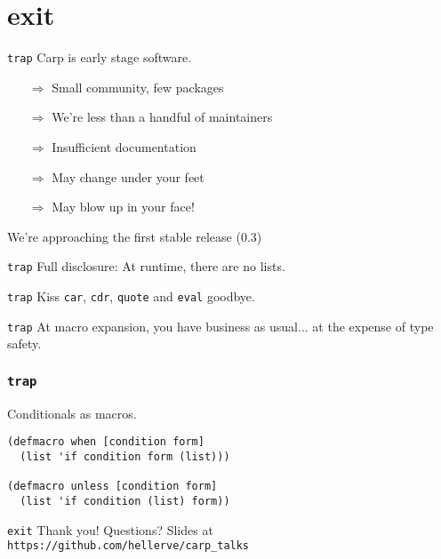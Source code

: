 \documentclass{beamer}
\begin{document}
  \section{exit}
  \begin{frame}{\texttt{trap}}
    Carp is early stage software.
    \begin{itemize}
      \item[$\Rightarrow$] Small community, few packages
      \item[$\Rightarrow$] We’re less than a handful of maintainers
      \item[$\Rightarrow$] Insufficient documentation
      \item[$\Rightarrow$] May change under your feet
      \item[$\Rightarrow$] May blow up in your face!
    \end{itemize}
    We’re approaching the first stable release (0.3)
  \end{frame}
  \begin{frame}{\texttt{trap}}
    Full disclosure: At runtime, there are no lists.
  \end{frame}
  \begin{frame}{\texttt{trap}}
    Kiss \texttt{car}, \texttt{cdr}, \texttt{quote} and \texttt{eval} goodbye.
  \end{frame}
  \begin{frame}{\texttt{trap}}
    At macro expansion, you have business as usual... at the expense of type safety.
  \end{frame}
  \begin{frame}[fragile]
    \frametitle{\texttt{trap}}
    \begin{listing}[H]
      \caption{Conditionals as macros.}
      \begin{verbatim}
(defmacro when [condition form]
  (list 'if condition form (list)))

(defmacro unless [condition form]
  (list 'if condition (list) form))
      \end{verbatim}
    \end{listing}
  \end{frame}
  \begin{frame}{\texttt{exit}}
    \Huge Thank you!
    \linebreak
    \linebreak
    \linebreak
    \small Questions?
    \linebreak
    \linebreak
    \tiny Slides at \texttt{https://github.com/hellerve/carp\_talks}
  \end{frame}
\end{document}
